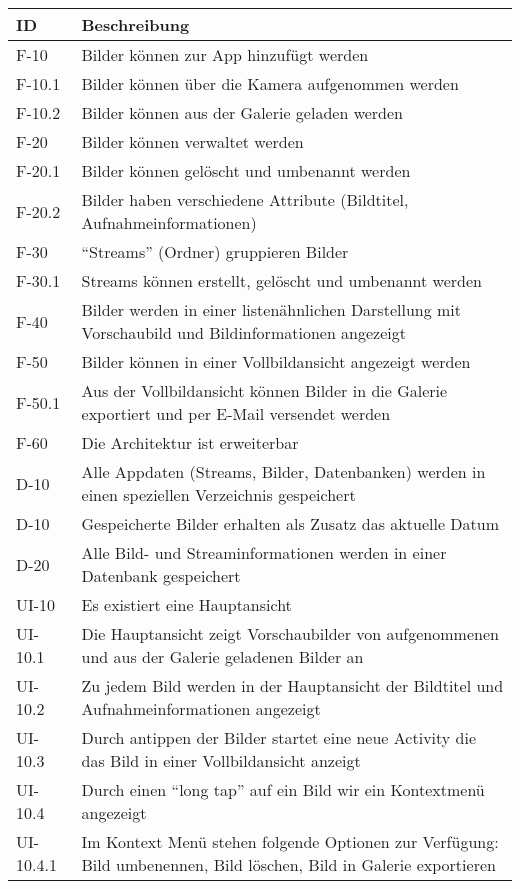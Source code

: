 \begin{center}
\begin{longtable}{|l|p{12cm}|}
\toprule
\textbf{ID} & \textbf{Beschreibung} \\
\hline
\endhead
\hline
\endfoot
F-10 & Bilder können zur App hinzufügt werden\\
F-10.1 & Bilder können über die Kamera aufgenommen werden\\
F-10.2 & Bilder können aus der Galerie geladen werden\\
F-20 & Bilder können verwaltet werden\\
F-20.1 & Bilder können gelöscht und umbenannt werden\\
F-20.2 & Bilder haben verschiedene Attribute (Bildtitel, Aufnahmeinformationen)\\
F-30 & \enquote{Streams} (Ordner) gruppieren Bilder\\
F-30.1 & Streams können erstellt, gelöscht und umbenannt werden\\
F-40 & Bilder werden in einer listenähnlichen Darstellung mit Vorschaubild und Bildinformationen angezeigt\\
F-50 & Bilder können in einer Vollbildansicht angezeigt werden\\
F-50.1 & Aus der Vollbildansicht können Bilder in die Galerie exportiert und per E-Mail versendet werden\\
F-60 & Die Architektur ist erweiterbar\\
\hline
D-10 & Alle Appdaten (Streams, Bilder, Datenbanken) werden in einen speziellen Verzeichnis gespeichert\\
D-10 & Gespeicherte Bilder erhalten als Zusatz das aktuelle Datum\\
D-20 & Alle Bild- und Streaminformationen werden in einer Datenbank gespeichert\\
\hline
UI-10 &  Es existiert eine Hauptansicht\\
UI-10.1 &  Die Hauptansicht zeigt Vorschaubilder von aufgenommenen und aus der Galerie geladenen Bilder an\\
UI-10.2 &  Zu jedem Bild werden in der Hauptansicht der Bildtitel und Aufnahmeinformationen angezeigt\\
UI-10.3 &  Durch antippen der Bilder startet eine neue Activity die das Bild in einer Vollbildansicht anzeigt\\
UI-10.4 &  Durch einen \enquote{long tap} auf ein Bild wir ein Kontextmenü angezeigt\\
UI-10.4.1 & Im Kontext Menü stehen folgende Optionen zur Verfügung: Bild umbenennen, Bild löschen, Bild in Galerie exportieren\\

\end{longtable}
\end{center}
